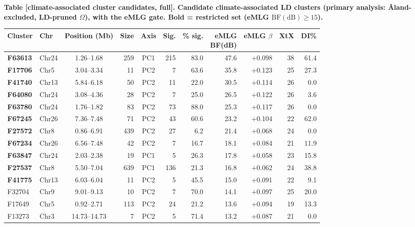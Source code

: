 \documentclass[border=12pt]{standalone}
\begin{document}
\begin{minipage}{18.5cm}
\raggedright
{\color{Accent}\bfseries Table [climate-associated cluster candidates, full]. Candidate climate-associated LD clusters (primary analysis: {\AA}land-excluded, LD-pruned $\Omega$), with the eMLG gate. Bold = restricted set (eMLG $\mathrm{BF(dB)}\geq 15$).}

\vspace{6pt}
\begin{center}\scriptsize
\begin{tabular}{@{}l l c r c r r r r r r@{}}
\toprule
Cluster & Chr & Position (Mb) & Size & Axis & Sig. & \% sig. & \makecell{eMLG\\BF(dB)} & \makecell{eMLG\\$\beta$} & XtX & DI\% \\
\midrule
\textbf{F63613} & Chr24 & 1.26--1.68 & 259 & PC1 & 215 & 83.0 & 47.6 & +0.098 & 38 & 61.4 \\
\textbf{F17706} & Chr5 & 3.04--3.34 & 11 & PC2 & 7 & 63.6 & 35.8 & +0.123 & 25 & 27.3 \\
\textbf{F41740} & Chr13 & 5.84--6.18 & 50 & PC2 & 11 & 22.0 & 30.5 & +0.114 & 26 & 0.0 \\
\textbf{F64080} & Chr24 & 3.08--4.36 & 28 & PC2 & 7 & 25.0 & 26.5 & +0.122 & 26 & 3.6 \\
\textbf{F63780} & Chr24 & 1.76--1.82 & 83 & PC2 & 73 & 88.0 & 25.3 & +0.117 & 26 & 0.0 \\
\textbf{F67245} & Chr26 & 7.36--7.48 & 71 & PC2 & 43 & 60.6 & 23.2 & +0.104 & 22 & 62.0 \\
\textbf{F27572} & Chr8 & 0.86--6.91 & 439 & PC2 & 27 & 6.2 & 21.4 & +0.068 & 24 & 0.0 \\
\textbf{F67234} & Chr26 & 6.56--7.48 & 42 & PC2 & 7 & 16.7 & 18.1 & +0.084 & 21 & 11.9 \\
\textbf{F63847} & Chr24 & 2.03--2.38 & 19 & PC1 & 5 & 26.3 & 17.8 & +0.058 & 23 & 15.8 \\
\textbf{F27537} & Chr8 & 5.50--7.04 & 639 & PC1 & 136 & 21.3 & 16.8 & +0.062 & 24 & 38.8 \\
\textbf{F41775} & Chr13 & 6.03--6.04 & 11 & PC2 & 5 & 45.5 & 15.0 & +0.091 & 22 & 9.1 \\
\midrule
F32704 & Chr9 & 9.01--9.13 & 10 & PC2 & 7 & 70.0 & 14.1 & +0.097 & 25 & 20.0 \\
F17649 & Chr5 & 0.92--2.71 & 113 & PC2 & 24 & 21.2 & 13.6 & +0.094 & 19 & 13.3 \\
F13273 & Chr3 & 14.73--14.73 & 7 & PC2 & 5 & 71.4 & 13.2 & +0.087 & 21 & 0.0 \\

\end{tabular}
\end{center}
\end{minipage}
\end{document}
